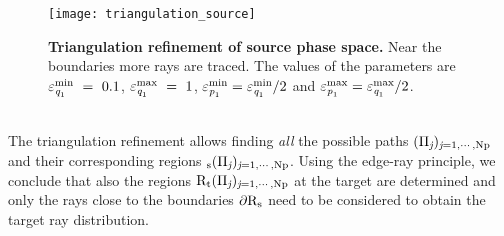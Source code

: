 \hfill
\begin{figure}[h]
  \begin{center}
  \texttt{[image: triangulation\_source]}
  \end{center}
  \caption{\textbf{Triangulation refinement of source phase space.} 
Near the boundaries more rays are traced.
    The values of the parameters are $\varepsilon_{\textit{q}_1}^\textrm{min}~=~ 0.1$, $\varepsilon_{\textit{q}_1}^\textrm{max}~=~1$, $\varepsilon_{\textit{p}_1}^\textrm{min}= \varepsilon_{\textit{q}_1}^\textrm{min}/2$ and $\varepsilon_{\textit{p}_1}^\textrm{max} = \varepsilon_{\textit{q}_1}^\textrm{max}/2$.}
   \label{fig:triangulation_refinement}
  \end{figure}
\\ \indent The triangulation refinement allows finding \textit{all} the possible paths $(\Pi_{\textit{j}})_{\textit{j} = 1, \cdots, \textrm{Np}}$ and their corresponding regions $_\textrm{s}(\Pi_{\textit{j}})_{\textit{j} = 1, \cdots, \textrm{Np}}$. Using the edge-ray principle, we conclude that also the regions $\mbox{$\textup{R}$}_\textrm{t}(\Pi_{\textit{j}})_{\textit{j} = 1, \cdots, \textrm{Np}}$ at the target are determined and only the rays close to the boundaries
$\partial\mbox{$\textup{R}$}_\textrm{s}$ need to be considered to obtain the target ray distribution.
